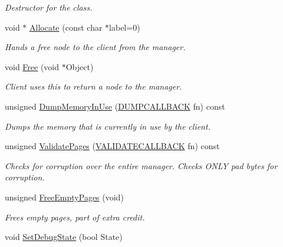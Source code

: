\begin{DoxyCompactItemize}
\begin{DoxyCompactList}\small\item\em Destructor for the class. \end{DoxyCompactList}\item 
void $\ast$ \hyperlink{classObjectAllocator_a9b102fa9a71e7db59f0915f693133622}{Allocate} (const char $\ast$label=0)
\begin{DoxyCompactList}\small\item\em Hands a free node to the client from the manager. \end{DoxyCompactList}\item 
void \hyperlink{classObjectAllocator_aa0bfa44d53482b826be0f09ee1bb970c}{Free} (void $\ast$Object)
\begin{DoxyCompactList}\small\item\em Client uses this to return a node to the manager. \end{DoxyCompactList}\item 
unsigned \hyperlink{classObjectAllocator_a4a5523642f3de6d21755e164b05beca6}{Dump\-Memory\-In\-Use} (\hyperlink{classObjectAllocator_a24de32ff63104b1c2c69bc03356eb736}{D\-U\-M\-P\-C\-A\-L\-L\-B\-A\-C\-K} fn) const 
\begin{DoxyCompactList}\small\item\em Dumps the memory that is currently in use by the client. \end{DoxyCompactList}\item 
unsigned \hyperlink{classObjectAllocator_add5aa5865150e33943d7cdeee11d3bcf}{Validate\-Pages} (\hyperlink{classObjectAllocator_aca4db22d00e33e35292aca076d3942ac}{V\-A\-L\-I\-D\-A\-T\-E\-C\-A\-L\-L\-B\-A\-C\-K} fn) const 
\begin{DoxyCompactList}\small\item\em Checks for corruption over the entire manager. Checks O\-N\-L\-Y pad bytes for corruption. \end{DoxyCompactList}\item 
unsigned \hyperlink{classObjectAllocator_aef24417a325b4a6a151177a2de192f99}{Free\-Empty\-Pages} (void)
\begin{DoxyCompactList}\small\item\em Frees empty pages, part of extra credit. \end{DoxyCompactList}\item 
\hypertarget{classObjectAllocator_a0d921f5d6ae2a300feb18c7efa874ad3}{void \hyperlink{classObjectAllocator_a0d921f5d6ae2a300feb18c7efa874ad3}{Set\-Debug\-State} (bool State)}\label{classObjectAllocator_a0d921f5d6ae2a300feb18c7efa874ad3}


\end{DoxyCompactItemize}
